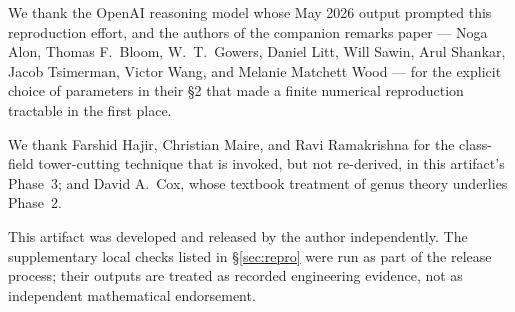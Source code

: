 
We thank the OpenAI reasoning model whose May 2026 output prompted
this reproduction effort, and the authors of the companion remarks
paper \cite{Sawin2026Remarks} --- Noga Alon, Thomas F.~Bloom,
W.~T.~Gowers, Daniel Litt, Will Sawin, Arul Shankar, Jacob Tsimerman,
Victor Wang, and Melanie Matchett Wood --- for the explicit choice of
parameters in their \S2 that made a finite numerical reproduction
tractable in the first place.

We thank Farshid Hajir, Christian Maire, and Ravi Ramakrishna for the
class-field tower-cutting technique \cite{HajirMaire2001} that is
invoked, but not re-derived, in this artifact's Phase~3; and David
A.~Cox, whose textbook treatment of genus theory underlies Phase~2.

This artifact was developed and released by the author independently.
The supplementary local checks listed in \S\ref{sec:repro} were run as
part of the release process; their outputs are treated as recorded
engineering evidence, not as independent mathematical endorsement.

